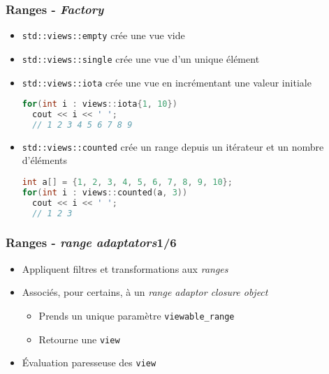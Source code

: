 \documentclass[C++.tex]{subfiles}
\begin{document}
\begin{frame}[fragile]
	\frametitle{Ranges - \textit{Factory}}
	\begin{itemize}
		\item \lstinline|std::views::empty| crée une vue vide
		\item \lstinline|std::views::single| crée une vue d'un unique élément
		\item \lstinline|std::views::iota| crée une vue en incrémentant une valeur initiale
	
		\begin{lstlisting}[language=C++]
for(int i : views::iota{1, 10})
  cout << i << ' ';
  // 1 2 3 4 5 6 7 8 9\end{lstlisting}
	
		\item \lstinline|std::views::counted| crée un range depuis un itérateur et un nombre d'éléments
	
		\begin{lstlisting}[language=C++]
int a[] = {1, 2, 3, 4, 5, 6, 7, 8, 9, 10};
for(int i : views::counted(a, 3))
  cout << i << ' ';
  // 1 2 3\end{lstlisting}
	\end{itemize}
\end{frame}

\begin{frame}[fragile]
	\frametitle{Ranges - \textit{range adaptators}\titlehfill{}1/6}
	\begin{itemize}
		\item Appliquent filtres et transformations aux \textit{ranges}
		\item Associés, pour certains, à un \textit{range adaptor closure object}
		\begin{itemize}
			\item Prends un unique paramètre \lstinline|viewable_range|
			\item Retourne une \lstinline|view|
		\end{itemize}
		\item Évaluation paresseuse des \lstinline|view|
	\end{itemize}
\end{frame}
\end{document}
